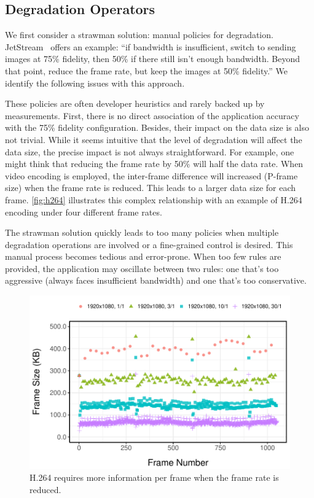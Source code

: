 \subsection{Degradation Operators}
\label{sec:prog-abs}

We first consider a strawman solution: manual policies for
degradation. JetStream~\cite{rabkin2014aggregation} offers an example: ``if
bandwidth is insufficient, switch to sending images at 75\% fidelity, then 50\%
if there still isn't enough bandwidth. Beyond that point, reduce the frame rate,
but keep the images at 50\% fidelity.'' We identify the following issues with
this approach.

 These policies are often developer heuristics and
rarely backed up by measurements. First, there is no direct association of the
application accuracy with the 75\% fidelity configuration. Besides, their impact
on the data size is also not trivial.  While it seems intuitive that the level
of degradation will affect the data size, the precise impact is not always
straightforward. For example, one might think that reducing the frame rate by
50\% will half the data rate. When video encoding is employed, the inter-frame
difference will increased (P-frame size) when the frame rate is reduced. This
leads to a larger data size for each frame. \autoref{fig:h264} illustrates this
complex relationship with an example of H.264 encoding under four different
frame rates.

 The strawman solution quickly leads to too many policies
when multiple degradation operations are involved or a fine-grained control is
desired. This manual process becomes tedious and error-prone. When too few rules
are provided, the application may oscillate between two rules: one that's too
aggressive (always faces insufficient bandwidth) and one that's too
conservative.

\begin{figure}
  \centering
  \includegraphics[width=\columnwidth]{figures/h264.pdf}
  \caption{H.264 requires more information per frame when the frame rate is
    reduced.}
  \label{fig:h264}
\end{figure}

